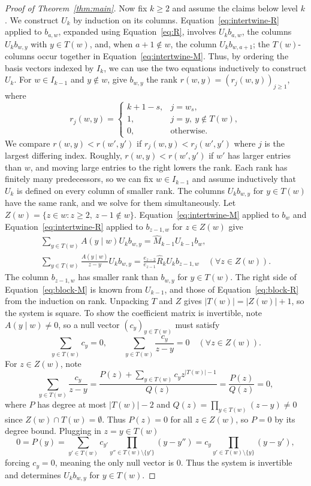 \documentclass[12pt]{article}
\theoremstyle{plain}
\theoremstyle{definition}
\theoremstyle{remark}
\begin{document}
\begin{proof}[Proof of Theorem~\ref{thm:main}]
Now fix $k\ge2$ and assume the claims below level $k$. We construct $U_k$
by induction on its columns. Equation~\eqref{eq:intertwine-R} applied to $b_{a,w}$, expanded using Equation~\eqref{eq:R}, involves
$U_kb_{a,w}$, the columns $U_kb_{w,y}$ with $y\in T(w)$, and, when
$a+1\notin w$, the column $U_kb_{w,a+1}$; the $T(w)$-columns occur together
in Equation~\eqref{eq:intertwine-M}. Thus, by ordering the basis vectors
indexed by $I_k$, we can use the two equations inductively to construct
$U_k$. For $w\in I_{k-1}$
and $y\notin w$, give $b_{w,y}$ the rank $r(w,y)=(r_j(w,y))_{j\ge1}$, where
\[
r_j(w,y)=
\begin{cases}
k+1-s,&j=w_s,\\
1,&j=y,\ y\notin T(w),\\
0,&\text{otherwise}.
\end{cases}
\]
We compare $r(w,y)<r(w',y')$ if $r_j(w,y)<r_j(w',y')$ where $j$ is the largest differing index. Roughly, $r(w,y)<r(w',y')$ if $w'$ has larger entries than
$w$, and moving large entries to the right lowers the rank. Each rank has
finitely many predecessors, so we can fix $w\in I_{k-1}$ and assume inductively that
$U_k$ is defined on every column of smaller rank. The columns
$U_kb_{w,y}$ for $y\in T(w)$ have the same rank, and we solve for them
simultaneously. Let
$Z(w)=\{z\in w:z\ge2,\ z-1\notin w\}$. Equation~\eqref{eq:intertwine-M}
applied to $b_w$ and Equation~\eqref{eq:intertwine-R} applied to
$b_{z-1,w}$ for $z\in Z(w)$ give
\begin{gather}
\sum_{y\in T(w)}A(y\mid w)U_kb_{w,y}
 =\hat M_{k-1}U_{k-1}b_w,\label{eq:block-M}\\
\sum_{y\in T(w)}\frac{A(y\mid w)}{z-y}U_kb_{w,y}
 =\frac{e_{z-2}}{e_{z-1}}\hat R_kU_kb_{z-1,w}
\quad(\forall z\in Z(w)).\label{eq:block-R}
\end{gather}
The column $b_{z-1,w}$ has smaller rank than $b_{w,y}$ for $y\in T(w)$.
The right side of Equation~\eqref{eq:block-M} is known from $U_{k-1}$, and
those of Equation~\eqref{eq:block-R} from the induction on rank. Unpacking $T$ and $Z$ gives $|T(w)|=|Z(w)|+1$, so the system is square. To show the coefficient matrix is invertible, note $A(y\mid w) \neq 0$, so a null vector $(c_y)_{y\in T(w)}$ must satisfy
\[
\sum_{y\in T(w)}c_y=0,\qquad
\sum_{y\in T(w)}\frac{c_y}{z-y}=0\quad(\forall z\in Z(w)).
\]
For $z\in Z(w)$, note
\[\sum_{y\in T(w)}\frac{c_y}{z-y}=\frac{P(z)+\sum_{y\in T(w)}c_y z^{|T(w)|-1}}{Q(z)}=\frac{P(z)}{Q(z)}=0,\]
where $P$ has degree at most $|T(w)|-2$ and $Q(z)=\prod_{y\in T(w)}(z-y)\neq 0$ since $Z(w) \cap T(w)=\emptyset$.
Thus $P(z)=0$ for all $z\in Z(w)$, so $P=0$ by its degree bound. Plugging in $z=y\in T(w)$
\[
0=P(y)=\sum_{y'\in T(w)}c_{y'}\prod_{y''\in T(w)\setminus\{y'\}}(y-y'') = c_y\prod_{y'\in T(w)\setminus\{y\}}(y-y'),
\]
forcing $c_y=0$, meaning the only null vector is 0. Thus the system is invertible and determines $U_kb_{w,y}$ for $y\in T(w)$.


\end{proof}
\end{document}
